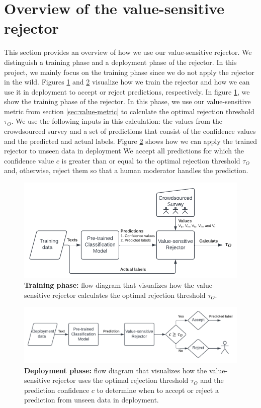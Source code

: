 \section{Overview of the value-sensitive rejector}
\label{sec:overview-rejector}
This section provides an overview of how we use our value-sensitive rejector.
%
We distinguish a training phase and a deployment phase of the rejector.
%
In this project, we mainly focus on the training phase since we do not apply the rejector in the wild.
%
Figures \ref{fig:training} and \ref{fig:deployment} visualize how we train the rejector and how we can use it in deployment to accept or reject predictions, respectively.
%
In figure \ref{fig:training}, we show the training phase of the rejector.
%
In this phase, we use our value-sensitive metric from section \ref{sec:value-metric} to calculate the optimal rejection threshold $\tau_O$.
%
We use the following inputs in this calculation: the values from the crowdsourced survey and a set of predictions that consist of the confidence values and the predicted and actual labels.
%
Figure \ref{fig:deployment} shows how we can apply the trained rejector to unseen data in deployment
%
We accept all predictions for which the confidence value $c$ is greater than or equal to the optimal rejection threshold $\tau_O$ and, otherwise, reject them so that a human moderator handles the prediction.
%
\begin{figure}
    \centering
    \includegraphics[scale=.7]{Figures/training.pdf}
    \caption{\textbf{Training phase:} flow diagram that visualizes how the value-sensitive rejector calculates the optimal rejection threshold $\tau_O$.}
    \label{fig:training}
\end{figure}
%
\begin{figure}
    \centering
    \includegraphics[scale=.7]{Figures/deployment.pdf}
    \caption{\textbf{Deployment phase:} flow diagram that visualizes how the value-sensitive rejector uses the optimal rejection threshold $\tau_O$ and the prediction confidence $c$ to determine when to accept or reject a prediction from unseen data in deployment.}
    \label{fig:deployment}
\end{figure}

